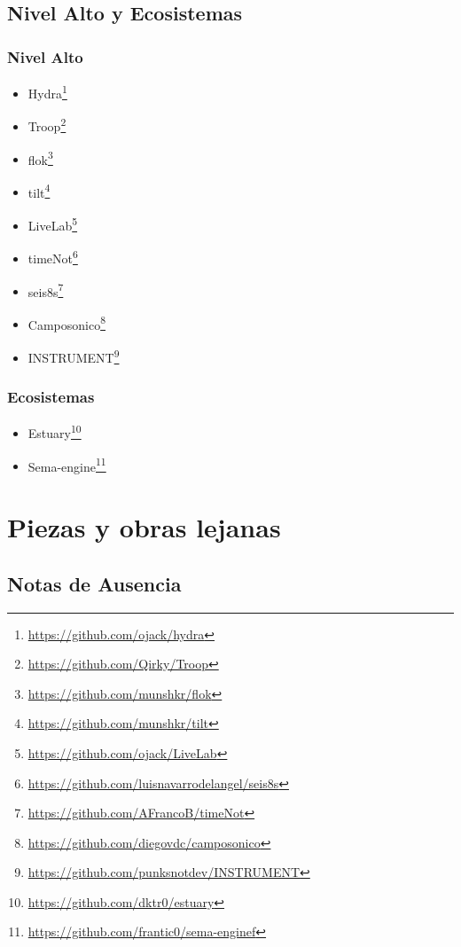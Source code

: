\subsection{Nivel Alto y Ecosistemas}

\subsubsection{Nivel Alto}

\begin{itemize}
\item Hydra\footnote{\url{https://github.com/ojack/hydra}}
\item Troop\footnote{\url{https://github.com/Qirky/Troop}}
\item flok\footnote{\url{https://github.com/munshkr/flok}}
\item tilt\footnote{\url{https://github.com/munshkr/tilt}}
\item LiveLab\footnote{\url{https://github.com/ojack/LiveLab}}
\item timeNot\footnote{\url{https://github.com/luisnavarrodelangel/seis8s}}
\item seis8s\footnote{\url{https://github.com/AFrancoB/timeNot}}
\item Camposonico\footnote{\url{https://github.com/diegovdc/camposonico}}
\item INSTRUMENT\footnote{\url{https://github.com/punksnotdev/INSTRUMENT}}
\end{itemize}


\subsubsection{Ecosistemas}

\begin{itemize}
\item Estuary\footnote{\url{https://github.com/dktr0/estuary}}
\item Sema-engine\footnote{\url{https://github.com/frantic0/sema-enginef}}
\end{itemize}

\section{Piezas y obras lejanas}

\subsection{Notas de Ausencia} %


